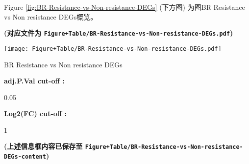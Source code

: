 \documentclass[
]{article}
\begin{document}
\begin{center}\vspace{1.5cm}\end{center}

\begin{center}\vspace{1.5cm}\end{center}

Figure \ref{fig:BR-Resistance-vs-Non-resistance-DEGs} (下方图) 为图BR Resistance vs Non resistance DEGs概览。

\textbf{(对应文件为 \texttt{Figure+Table/BR-Resistance-vs-Non-resistance-DEGs.pdf})}

\def\@captype{figure}
\begin{center}
\texttt{[image: Figure+Table/BR-Resistance-vs-Non-resistance-DEGs.pdf]}
\caption{BR Resistance vs Non resistance DEGs}\label{fig:BR-Resistance-vs-Non-resistance-DEGs}
\end{center}

\begin{center}\vspace{1.5cm}\end{center}\begin{center}\begin{tcolorbox}[colback=gray!10, colframe=gray!50, width=0.9\linewidth, arc=1mm, boxrule=0.5pt]
\textbf{
adj.P.Val cut-off
:}

\vspace{0.5em}

    0.05

\vspace{2em}


\textbf{
Log2(FC) cut-off
:}

\vspace{0.5em}

    1

\vspace{2em}
\end{tcolorbox}
\end{center}

\textbf{(上述信息框内容已保存至 \texttt{Figure+Table/BR-Resistance-vs-Non-resistance-DEGs-content})}

\begin{center}\vspace{1.5cm}\end{center}
\end{document}
